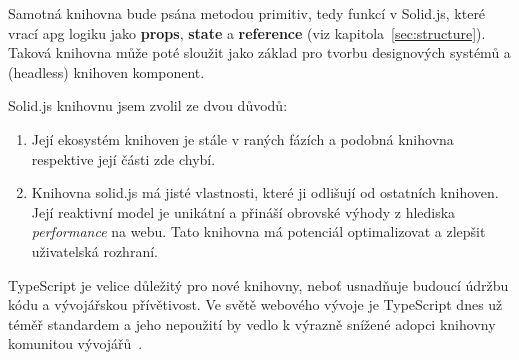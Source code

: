 Samotná knihovna bude psána metodou primitiv, tedy funkcí v Solid.js, které vrací \gls{apg} logiku jako \textbf{props}, \textbf{state} a \textbf{reference} (viz kapitola~\ref{sec:structure}).
Taková knihovna může poté sloužit jako základ pro tvorbu designových systémů a (headless) knihoven komponent.

Solid.js knihovnu jsem zvolil ze dvou důvodů:

\begin{enumerate}
  \item Její ekosystém knihoven je stále v raných fázích a podobná knihovna respektive její části zde chybí.
  \item Knihovna solid.js má jisté vlastnosti, které ji odlišují od ostatních knihoven.
        Její reaktivní model je unikátní a přináší obrovské výhody z hlediska \textit{performance} na webu.
        Tato knihovna má potenciál optimalizovat a zlepšit uživatelská rozhraní.
\end{enumerate}

TypeScript je velice důležitý pro nové knihovny, neboť usnadňuje budoucí údržbu kódu a vývojářskou přívětivost.
Ve světě webového vývoje je TypeScript dnes už téměř standardem a jeho nepoužití by vedlo k výrazně snížené adopci knihovny komunitou vývojářů~\cite{stateofjs-2022}.
